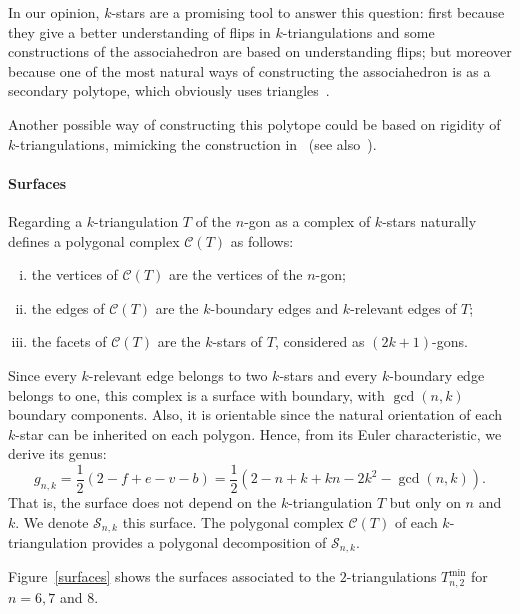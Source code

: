 \documentclass[12pt]{amsart}
\begin{document}
In our opinion, $k$-stars are a promising tool to answer this question: first because they give a better understanding of flips in $k$-triangulations and some constructions of the associahedron are based on understanding flips; but moreover because one of the most natural ways of constructing the associahedron is as a secondary polytope, which obviously uses triangles~\cite{bfs-ccsp-90, s-gbfscc-06}.

Another possible way of constructing this polytope could be based on rigidity of $k$-triangulations, mimicking the construction in~\cite{rss-empppt-03} (see also~\cite{rss-pt-06}).

\bigskip

\paragraph{{\sc Surfaces}}

Regarding a $k$-triangulation $T$ of the $n$-gon as a complex of $k$-stars naturally defines a polygonal complex $\mathcal{C}(T)$ as follows:
\begin{enumerate}[(i)]
\item the vertices of $\mathcal{C}(T)$ are the vertices of the $n$-gon;
\item the edges of $\mathcal{C}(T)$ are the $k$-boundary edges and $k$-relevant edges of $T$;
\item the facets of $\mathcal{C}(T)$ are the $k$-stars of $T$, considered as $(2k+1)$-gons.
\end{enumerate}
Since every $k$-relevant edge belongs to two $k$-stars and every $k$-boundary edge belongs to one, this complex is a surface with boundary, with $\gcd(n,k)$ boundary components. Also, it is orientable since the natural orientation of each $k$-star can be inherited on each polygon. Hence, from its Euler characteristic, we derive its genus:
$$g_{n,k}=\frac{1}{2}(2-f+e-v-b)=\frac{1}{2}(2-n+k+kn-2k^2-\gcd(n,k)).$$
That is, the surface does not depend on the $k$-triangulation $T$ but only on $n$ and $k$. We denote $\mathcal{S}_{n,k}$ this surface. The polygonal complex $\mathcal{C}(T)$ of each $k$-triangulation provides a polygonal decomposition of $\mathcal{S}_{n,k}$.

Figure~\ref{surfaces} shows the surfaces associated to the $2$-triangulations $T_{n,2}^{\min}$ for $n=6,7$ and $8$.
\end{document}
